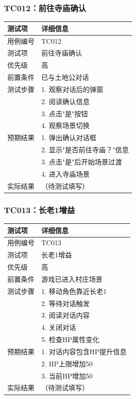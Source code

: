 \documentclass[a4paper,12pt]{article}
\begin{document}
\subsubsection{TC012：前往寺庙确认}
\begin{table}[h]
\centering
\begin{tabular}{ll}
\toprule
测试项 & 详细信息 \\
\midrule
用例编号 & TC012 \\
测试项 & 前往寺庙确认 \\
优先级 & 高 \\
前置条件 & 已与土地公对话 \\
测试步骤 & 1. 观察对话后的弹窗 \\
 & 2. 阅读确认信息 \\
 & 3. 点击"是"按钮 \\
 & 4. 观察场景切换 \\
预期结果 & 1. 弹出确认对话框 \\
 & 2. 显示"是否前往寺庙？"信息 \\
 & 3. 点击"是"后开始场景过渡 \\
 & 4. 进入寺庙场景 \\
实际结果 & （待测试填写） \\
\bottomrule
\end{tabular}
\end{table}

\subsubsection{TC013：长老1增益}
\begin{table}[h]
\centering
\begin{tabular}{ll}
\toprule
测试项 & 详细信息 \\
\midrule
用例编号 & TC013 \\
测试项 & 长老1增益 \\
优先级 & 高 \\
前置条件 & 游戏已进入村庄场景 \\
测试步骤 & 1. 移动角色靠近长老1 \\
 & 2. 等待对话触发 \\
 & 3. 阅读对话内容 \\
 & 4. 关闭对话 \\
 & 5. 检查HP属性变化 \\
预期结果 & 1. 对话内容包含HP提升信息 \\
 & 2. HP上限增加50 \\
 & 3. 当前HP增加50 \\
实际结果 & （待测试填写） \\
\bottomrule
\end{tabular}
\end{table}
\end{document}
